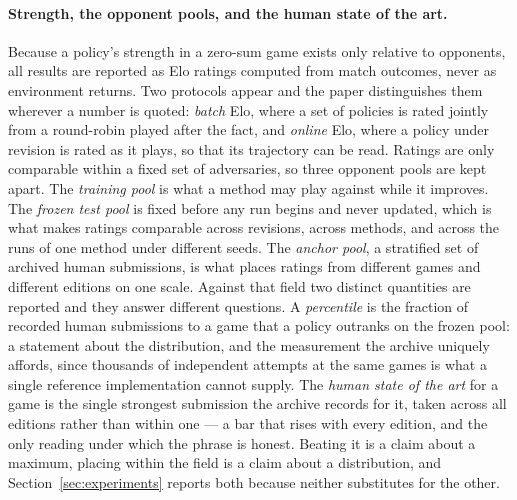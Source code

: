 \paragraph{Strength, the opponent pools, and the human state of the art.}
Because a policy's strength in a zero-sum game exists only relative to
opponents, all results are reported as Elo ratings computed from match outcomes,
never as environment returns. Two protocols appear and the paper distinguishes
them wherever a number is quoted: \emph{batch} Elo, where a set of policies is
rated jointly from a round-robin played after the fact, and \emph{online} Elo,
where a policy under revision is rated as it plays, so that its trajectory can be
read. Ratings are only comparable within a fixed set of adversaries, so three
opponent pools are kept apart. The \emph{training pool} is what a method may play
against while it improves. The \emph{frozen test pool} is fixed before any run
begins and never updated, which is what makes ratings comparable across
revisions, across methods, and across the runs of one method under different
seeds. The \emph{anchor pool}, a stratified set of archived human submissions, is
what places ratings from different games and different editions on one scale.
Against that field two distinct quantities are reported and they answer different
questions. A \emph{percentile} is the fraction of recorded human submissions to a
game that a policy outranks on the frozen pool: a statement about the
distribution, and the measurement the archive uniquely affords, since thousands
of independent attempts at the same games is what a single reference
implementation cannot supply. The \emph{human state of the art} for a game is the
single strongest submission the archive records for it, taken across all
 editions rather than within one --- a bar that rises with every
edition, and the only reading under which the phrase is honest. Beating it is a
claim about a maximum, placing within the field is a claim about a distribution,
and Section~\ref{sec:experiments} reports both because neither substitutes for
the other.

